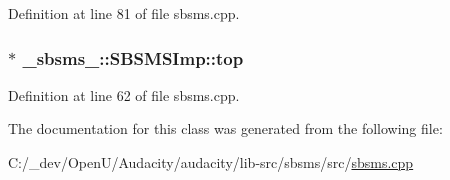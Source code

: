 Definition at line 81 of file sbsms.\+cpp.

\subsubsection[{\texorpdfstring{top}{top}}]{$\ast$ \+\_\+sbsms\+\_\+\+::\+S\+B\+S\+M\+S\+Imp\+::top}\hypertarget{class__sbsms___1_1_s_b_s_m_s_imp_a190bb3fc4e584e5db761ff93f7885137}{}\label{class__sbsms___1_1_s_b_s_m_s_imp_a190bb3fc4e584e5db761ff93f7885137}


Definition at line 62 of file sbsms.\+cpp.



The documentation for this class was generated from the following file\+:\begin{DoxyCompactItemize}
\item 
C\+:/\+\_\+dev/\+Open\+U/\+Audacity/audacity/lib-\/src/sbsms/src/\hyperlink{sbsms_8cpp}{sbsms.\+cpp}\end{DoxyCompactItemize}
